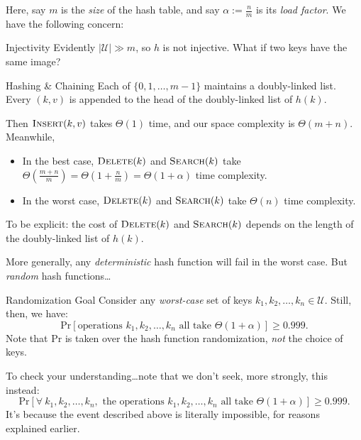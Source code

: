 Here, say $m$ is the \emph{size} of the hash table, and say $\alpha := \frac{n}{m}$ is its \emph{load factor}.  We have the following concern:

\begin{problem}{Injectivity}
    Evidently $|\mathcal{U}| \gg m$, so $h$ is not injective.  What if two keys have the same image?
\end{problem}

\begin{solution}{Hashing \& Chaining}
    Each of $\{0, 1, \dots, m - 1\}$ maintains a doubly-linked list.  Every $(k, v)$ is appended to the head of the doubly-linked list of $h(k)$.

    Then $\textsc{Insert}(k, v)$ takes $\Theta(1)$ time, and our space complexity is $\Theta(m + n)$.  Meanwhile,
    \begin{itemize}
        \item In the best case, $\textsc{Delete}(k)$ and $\textsc{Search}(k)$ take $\Theta\left(\frac{m + n}{m}\right) = \Theta\left(1 + \frac{n}{m}\right) = \Theta(1 + \alpha)$ time complexity.
        \item In the worst case, $\textsc{Delete}(k)$ and $\textsc{Search}(k)$ take $\Theta(n)$ time complexity.
    \end{itemize}
    To be explicit: the cost of $\textsc{Delete}(k)$ and $\textsc{Search}(k)$ depends on the length of the doubly-linked list of $h(k)$.
\end{solution}

More generally, any \emph{deterministic} hash function will fail in the worst case.  But \emph{random} hash functions\dots

\begin{problem}{Randomization Goal}
Consider any \emph{worst-case} set of keys $k_1, k_2, \dots, k_n \in \mathcal{U}$.  Still, then, we have:
\[ \mathrm{Pr}\left [\text{operations } k_1, k_2, \dots, k_n \text{ all take } \Theta\left(1 + \alpha \right) \right ] \geq 0.999. \]
Note that $\mathrm{Pr}$ is taken over the hash function randomization, \emph{not} the choice of keys.
\end{problem}

To check your understanding\dots note that we don't seek, more strongly, this instead:
\[ \mathrm{Pr}\left [ \forall \ k_1, k_2, \dots, k_n, \text{ the operations } k_1, k_2, \dots, k_n \text{ all take } \Theta\left(1 + \alpha\right) \right ] \geq 0.999. \]
It's because the event described above is literally impossible, for reasons explained earlier.

